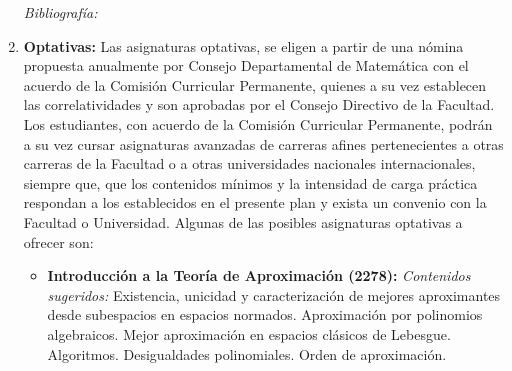 \documentclass[a4paper, 12pt]{article}
\begin{document}
\begin{enumerate}


\emph{Bibliografía:} \cite{buell2021mathematics,karaali2021mathematics,karaali2019mathematics,doi:10.1080/10511970.2018.1530707,doi:10.1080/10511970.2018.1512538,doi:10.1080/10511970.2018.1456498,doi:10.1080/10511970.2018.1530706,doi:10.1080/10511970.2018.1456497,doi:10.1080/10511970.2018.1472683,FredRoberts1395,JuanCarlosCortes1396,DonaldG.Saari1397,LeeRudolph1398,UrszulaStrawinska-Zanko1399,HuijiongWang1400,AhmadK.Naimzada1401,ClaudioCioffi-Revilla1402}

 



\item\textbf{Optativas:} 
Las asignaturas optativas, se eligen a partir de una nómina propuesta anualmente por Consejo Departamental de Matemática con el acuerdo de la Comisión Curricular Permanente, quienes a su vez establecen las correlatividades y son aprobadas por el Consejo Directivo de la Facultad. Los estudiantes, con acuerdo de la Comisión Curricular
Permanente, podrán a su vez cursar asignaturas avanzadas de carreras afines pertenecientes a otras carreras de la Facultad o a otras universidades nacionales internacionales, siempre que, que los contenidos mínimos y la intensidad de carga
práctica respondan a los establecidos en el presente plan y exista un convenio con la Facultad o Universidad.
Algunas de las posibles asignaturas optativas a ofrecer son:




\begin{itemize}


\item\textbf{Introducción a la Teoría de Aproximación (2278):}
\emph{Contenidos sugeridos:}
Existencia, unicidad y caracterización de mejores aproximantes desde subespacios en espacios normados. Aproximación por polinomios algebraicos.  Mejor aproximación en espacios clásicos de Lebesgue. Algoritmos. Desigualdades polinomiales. Orden de aproximación. 


\end{itemize}
\end{enumerate}
\end{document}
